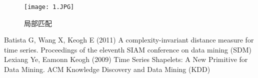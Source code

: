 \documentclass[a4paper, 11pt]{article}
\begin{document}
\begin{CJK}{UTF8}{gbsn}
\begin{figure}[htbp]
    \small
    \centering
    \texttt{[image: 1.JPG]}\\
    \caption{局部匹配\cite{Lexiang}}
\end{figure}

\newpage
\begin{thebibliography}{}
 Batista G, Wang X, Keogh E (2011) A complexity-invariant distance measure for time series. Proceedings of the eleventh SIAM conference on data mining (SDM)
 Lexiang Ye, Eamonn Keogh (2009) Time Series Shapelets: A New Primitive for Data Mining. ACM Knowledge Discovery and Data Mining (KDD)
\end{thebibliography}


\end{CJK}
\end{document}
